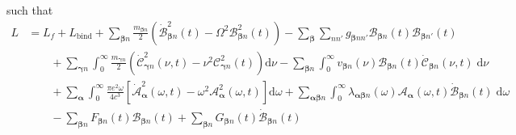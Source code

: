 \documentclass{article}
\begin{document}
such that
\begin{equation}
\begin{split}
L &= 
L_f + L_\mathrm{bind} + \sum_{\bm{\beta}n}\frac{m_{\bm{\beta}n}}{2}\left(\dot{\mathcal{B}}_{\bm{\beta}n}^2(t) - \Omega^2\mathcal{B}_{\bm{\beta}n}^2(t)\right) - \sum_{\bm{\beta}}\sum_{nn'}g_{\bm{\beta}nn'}\mathcal{B}_{\bm{\beta}n}(t)\mathcal{B}_{\bm{\beta}n'}(t)\\
&\qquad + \sum_{\bm{\gamma}n}\int_0^\infty\frac{m_{\bm{\gamma}n}}{2}\left(\dot{\mathcal{C}}_{\bm{\gamma}n}^2(\nu,t) - \nu^2\mathcal{C}_{\bm{\gamma}n}^2(t)\right)\mathrm{d}\nu - \sum_{\bm{\beta}n}\int_0^\infty v_{\bm{\beta}n}(\nu)\mathcal{B}_{\bm{\beta}n}(t)\dot{\mathcal{C}}_{\bm{\beta}n}(\nu,t)\;\mathrm{d}\nu\\
&\qquad + \sum_{\bm{\alpha}}\int_0^\infty\frac{\pi e^2\omega}{4c^3}\left[\dot{\mathcal{A}}_{\bm{\alpha}}^2(\omega,t) - \omega^2\mathcal{A}_{\bm{\alpha}}^2(\omega,t)\right]\mathrm{d}\omega + \sum_{\bm{\alpha}\bm{\beta}n}\int_0^\infty\lambda_{\bm{\alpha}\bm{\beta}n}(\omega)\mathcal{A}_{\bm{\alpha}}(\omega,t)\dot{\mathcal{B}}_{\bm{\beta}n}(t)\;\mathrm{d}\omega\\
&\qquad - \sum_{\bm{\beta}n}F_{\bm{\beta}n}(t)\mathcal{B}_{\bm{\beta}n}(t) + \sum_{\bm{\beta}n}G_{\bm{\beta}n}(t)\dot{\mathcal{B}}_{\bm{\beta}n}(t)
\end{split}
\end{equation}
\end{document}
